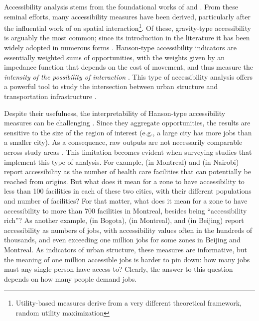 \documentclass[]{elsarticle} %
\begin{document}
Accessibility analysis stems from the foundational works of
\citet{harris_market_1954} and \citet{hansen1959}. From these seminal
efforts, many accessibility measures have been derived, particularly
after the influential work of \citet{wilson1971} on spatial
interaction\footnote{Utility-based measures derive from a very different
  theoretical framework, random utility maximization}. Of these,
gravity-type accessibility is arguably the most common; since its
introduction in the literature it has been widely adopted in numerous
forms
\citep{cervero_transportation_2002, paez2004network, geurs2004, levinson_accessibility_1998, Arranz2019measuring}.
Hanson-type accessibility indicators are essentially weighted sums of
opportunities, with the weights given by an impedance function that
depends on the cost of movement, and thus measure the \emph{intensity of
the possibility of interaction} \citep{hansen1959}. This type of
accessibility analysis offers a powerful tool to study the intersection
between urban structure and transportation infrastructure
\citep{handy_measuring_1997}.

Despite their usefulness, the interpretability of Hanson-type
accessibility measures can be challenging \citep{geurs2004, miller2018}.
Since they aggregate opportunities, the results are sensitive to the
size of the region of interest (e.g., a large city has more jobs than a
smaller city). As a consequence, raw outputs are not necessarily
comparable across study areas \citep{allen2019}. This limitation becomes
evident when surveying studies that implement this type of analysis. For
example, \citet{paez_healthcare_2010} (in Montreal) and
\citet{campbell_2019_accessibility} (in Nairobi) report accessibility as
the number of health care facilities that can potentially be reached
from origins. But what does it mean for a zone to have accessibility to
less than 100 facilities in each of these two cities, with their
different populations and number of facilities? For that matter, what
does it mean for a zone to have accessibility to more than 700
facilities in Montreal, besides being ``accessibility rich''? As another
example, \citet{bocarejo_s_transport_2012} (in Bogota),
\citet{elgeneidy_cost_2016} (in Montreal), and
\citet{jiang_2016_accessibility} (in Beijing) report accessibility as
numbers of jobs, with accessibility values often in the hundreds of
thousands, and even exceeding one million jobs for some zones in Beijing
and Montreal. As indicators of urban structure, these measures are
informative, but the meaning of one million accessible jobs is harder to
pin down: how many jobs must any single person have access to? Clearly,
the answer to this question depends on how many people demand jobs.
\end{document}
